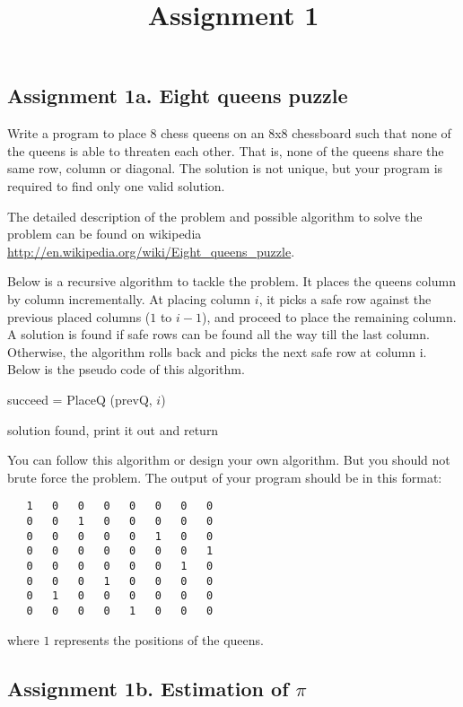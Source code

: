 \documentclass[12pt,a4paper,hidelinks]{article}            %
\title{\vspace{-3ex}Assignment 1\vspace{-7ex}}
\date{}
\begin{document}
\maketitle
\subsection*{Assignment 1a. Eight queens puzzle}
Write a program to place 8 chess queens on an 8x8 chessboard 
such that none of the queens is able to threaten each other.
That is, none of the queens share the same row, column or diagonal.
The solution is not unique, but your program is required to find only one valid solution.

The detailed description of the problem and possible algorithm to solve the problem can be found on wikipedia \url{http://en.wikipedia.org/wiki/Eight_queens_puzzle}.

Below is a recursive algorithm to tackle the problem.
It places the queens column by column incrementally. 
At placing column $i$, it picks a safe row against the previous placed columns ($1$ to $i-1$), 
and proceed to place the remaining column. A solution is found if safe rows can be found all the way till the last column.
Otherwise, the algorithm rolls back and picks the next safe row at column i.
Below is the pseudo code of this algorithm.

\begin{algorithm}
	\caption{succeed = PlaceQ (prevQ, $i$)}
	 {
		solution found, print it out and return
	}
\end{algorithm}

You can follow this algorithm or design your own algorithm.
But you should not brute force the problem.
The output of your program should be in this format:
\begin{verbatim}
   1   0   0   0   0   0   0   0
   0   0   1   0   0   0   0   0
   0   0   0   0   0   1   0   0
   0   0   0   0   0   0   0   1
   0   0   0   0   0   0   1   0
   0   0   0   1   0   0   0   0
   0   1   0   0   0   0   0   0
   0   0   0   0   1   0   0   0
\end{verbatim}
where $1$ represents the positions of the queens.

\subsection*{Assignment 1b. Estimation of $\pi$}
\end{document}
